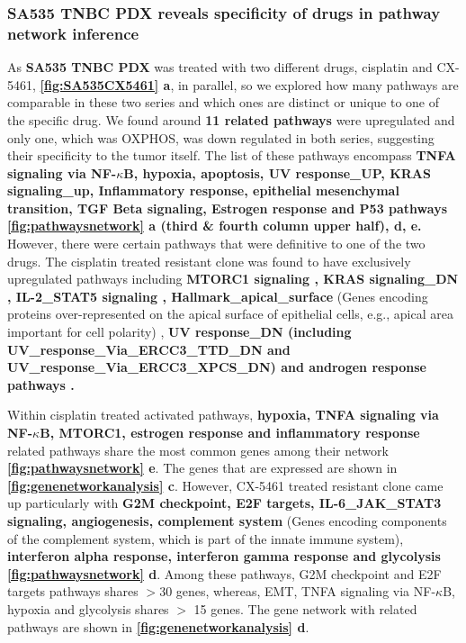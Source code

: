 
\subsubsection{SA535 TNBC PDX reveals specificity of drugs in pathway network inference} 
As \textbf{SA535 TNBC PDX} was treated with two different drugs, cisplatin and CX-5461, \textbf{\autoref{fig:SA535CX5461} a}, in parallel, so we explored how many pathways are comparable in these two series and which ones are distinct or unique to one of the specific drug. 
We found around \textbf{11 related pathways} were upregulated and only one, which was \ac{OXPHOS}, was down regulated in both series, suggesting their specificity to the tumor itself. The list of these pathways encompass \textbf{TNFA signaling via NF-$\kappa$B, hypoxia, apoptosis, UV response\_UP, KRAS signaling\_up, Inflammatory response, epithelial mesenchymal transition, TGF Beta signaling, Estrogen response and P53 pathways \textbf{\autoref{fig:pathwaysnetwork} a (third \& fourth column upper half), d, e}.} However, there were certain pathways that were definitive to one of the two drugs. The cisplatin treated resistant clone was found to have exclusively upregulated pathways including \textbf{MTORC1 signaling \cite{peng2010role}, KRAS signaling\_DN \cite{tao2014oncogenic}, IL-2\_STAT5 signaling \cite{wu2020activation, gutierrez2020role}, Hallmark\_apical\_surface} (Genes encoding proteins over-represented on the apical surface of epithelial cells, e.g., apical area important for cell polarity) \cite{halaoui2015rewiring, wodarz2007cell}, \textbf{UV response\_DN (including UV\_response\_Via\_ERCC3\_TTD\_DN
and UV\_response\_Via\_ERCC3\_XPCS\_DN) and androgen response pathways \cite{rampurwala2016role, michmerhuizen2020we}.}

Within cisplatin treated activated pathways, \textbf{hypoxia, TNFA signaling via NF-$\kappa$B, MTORC1, estrogen response and inflammatory response} related pathways share the most common genes among their network \textbf{\autoref{fig:pathwaysnetwork} e}. The genes that are expressed are shown in  \textbf{\autoref{fig:genenetworkanalysis} c}. However, CX-5461 treated resistant clone came up particularly with \textbf{G2M checkpoint, E2F targets, IL-6\_JAK\_STAT3 signaling, angiogenesis, complement system} (Genes encoding components of the complement system, which is part of the innate immune system), \textbf{ interferon alpha response, interferon gamma response and glycolysis} \textbf{\autoref{fig:pathwaysnetwork} d}. Among these pathways, G2M checkpoint and E2F targets pathways shares $>$30 genes, whereas, \ac{EMT}, TNFA signaling via NF-$\kappa$B, hypoxia and glycolysis shares $>$ 15 genes. The gene network with related pathways are shown in  \textbf{\autoref{fig:genenetworkanalysis} d}. 

